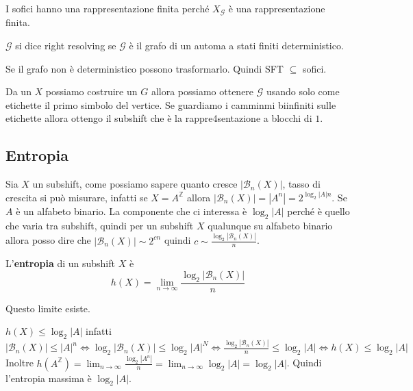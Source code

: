I sofici hanno una rappresentazione finita perché $X_\mathcal{G}$ è una rappresentazione 
finita. 

\begin{definizione}
    $\mathcal{G}$ si dice right resolving se $\mathcal{G}$ è il
    grafo di un automa a stati finiti deterministico.     
\end{definizione}

Se il grafo non è deterministico possono trasformarlo. Quindi SFT $\subseteq$ sofici.

Da un $X$ possiamo costruire un $G$ allora possiamo ottenere $\mathcal{G}$ usando solo
come etichette il primo simbolo del vertice. Se guardiamo i camminmi biinfiniti sulle
etichette allora ottengo il subshift che è la rappre4sentazione a blocchi di $1$.  

\subsection{Entropia}
Sia $X$ un subshift, come possiamo sapere quanto cresce $|\mathcal{B}_n(X)|$, tasso
di crescita si può misurare, infatti se $X=A^\mathbb{Z}$ allora $|\mathcal{B}_n(X)|=|A^n|= 2^{\log_2|A|n}$.
Se $A$ è un alfabeto binario. La componente che ci interessa è $\log_2 |A|$ perché
è quello che varia tra subshift, quindi per un subshift $X$ qualunque su alfabeto binario
allora posso dire che $|\mathcal{B}_n(X)| \sim 2^{cn}$ quindi $c\sim \frac{\log_2|\mathcal{B}_n(X)|}{n}$.

\begin{definizione}
    L'\textbf{entropia} di un subshift $X$ è 
    $$h(X) = \lim_{n\to \infty}\frac{\log_2|\mathcal{B}_n(X)|}{n}$$
\end{definizione}
Questo limite esiste.

\begin{nota}
    $h(X)\le \log_2|A|$ infatti
    $|\mathcal{B}_n(X)| \le |A|^n\iff \log_2 |\mathcal{B}_n(X)| \le \log_2 |A|^N \iff
    \frac{\log_2|\mathcal{B}_n(X)|}{n}\le \log_2|A|\iff h(X)\le \log_2|A|$
    Inoltre $h(A^\mathbb{Z}) = \lim_{n\to \infty}\frac{\log_2|A^n|}{n} =  \lim_{n\to \infty}\log_2|A| = \log_2|A|$.
    Quindi l'entropia massima è $\log_2|A|$.
\end{nota}

